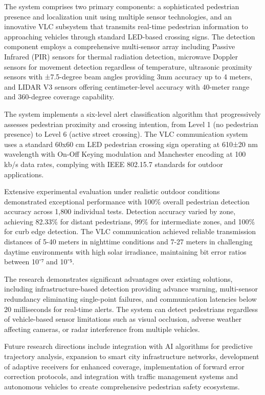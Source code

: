 \documentclass[a4paper, 12pt]{report}
\begin{document}
The system comprises two primary components: a sophisticated pedestrian presence and localization unit using multiple sensor technologies, and an innovative VLC subsystem that transmits real-time pedestrian information to approaching vehicles through standard LED-based crossing signs. The detection component employs a comprehensive multi-sensor array including Passive Infrared (PIR) sensors for thermal radiation detection, microwave Doppler sensors for movement detection regardless of temperature, ultrasonic proximity sensors with ±7.5-degree beam angles providing 3mm accuracy up to 4 meters, and LIDAR V3 sensors offering centimeter-level accuracy with 40-meter range and 360-degree coverage capability.

The system implements a six-level alert classification algorithm that progressively assesses pedestrian proximity and crossing intention, from Level 1 (no pedestrian presence) to Level 6 (active street crossing). The VLC communication system uses a standard 60x60 cm LED pedestrian crossing sign operating at 610±20 nm wavelength with On-Off Keying modulation and Manchester encoding at 100 kb/s data rates, complying with IEEE 802.15.7 standards for outdoor applications.

Extensive experimental evaluation under realistic outdoor conditions demonstrated exceptional performance with 100\% overall pedestrian detection accuracy across 1,800 individual tests. Detection accuracy varied by zone, achieving 82.33\% for distant pedestrians, 99\% for intermediate zones, and 100\% for curb edge detection. The VLC communication achieved reliable transmission distances of 5-40 meters in nighttime conditions and 7-27 meters in challenging daytime environments with high solar irradiance, maintaining bit error ratios between 10⁻⁷ and 10⁻⁵.

The research demonstrates significant advantages over existing solutions, including infrastructure-based detection providing advance warning, multi-sensor redundancy eliminating single-point failures, and communication latencies below 20 milliseconds for real-time alerts. The system can detect pedestrians regardless of vehicle-based sensor limitations such as visual occlusion, adverse weather affecting cameras, or radar interference from multiple vehicles.

Future research directions include integration with AI algorithms for predictive trajectory analysis, expansion to smart city infrastructure networks, development of adaptive receivers for enhanced coverage, implementation of forward error correction protocols, and integration with traffic management systems and autonomous vehicles to create comprehensive pedestrian safety ecosystems.
\end{document}
